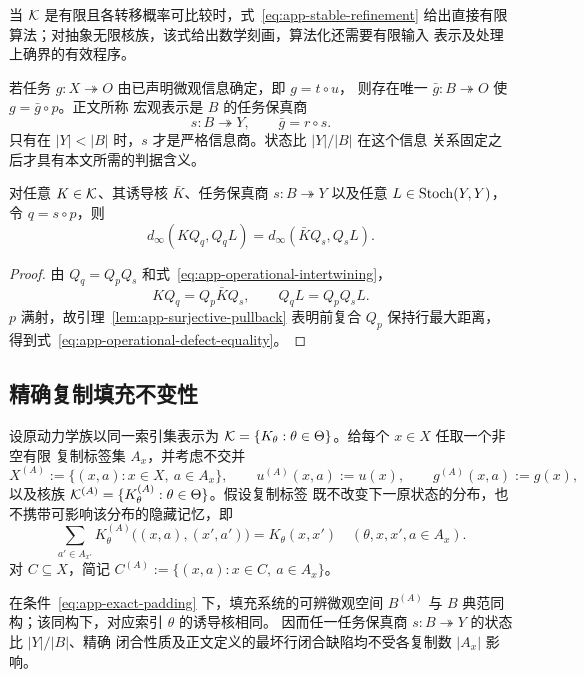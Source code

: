 当 $\mathcal K$ 是有限且各转移概率可比较时，式~\eqref{eq:app-stable-refinement}
给出直接有限算法；对抽象无限核族，该式给出数学刻画，算法化还需要有限输入
表示及处理上确界的有效程序。

若任务 $g:X\twoheadrightarrow O$ 由已声明微观信息确定，即 $g=t\circ u$，
则存在唯一 $\bar g:B\twoheadrightarrow O$ 使 $g=\bar g\circ p$。正文所称
宏观表示是 $B$ 的任务保真商
\[
  s:B\twoheadrightarrow Y,
  \qquad \bar g=r\circ s.
\]
只有在 $|Y|<|B|$ 时，$s$ 才是严格信息商。状态比 $|Y|/|B|$ 在这个信息
关系固定之后才具有本文所需的判据含义。

\begin{proposition}[约化前后闭合缺陷相同]
\label{prop:app-operational-defect-equality}
对任意 $K\in\mathcal K$、其诱导核 $\bar K$、任务保真商
$s:B\twoheadrightarrow Y$ 以及任意 $L\in\operatorname{Stoch}(Y,Y)$，令
$q=s\circ p$，则
\begin{equation}
 d_\infty(KQ_q,Q_qL)
 =
 d_\infty(\bar KQ_s,Q_sL).
 \label{eq:app-operational-defect-equality}
\end{equation}
\end{proposition}

\begin{proof}
由 $Q_q=Q_pQ_s$ 和式~\eqref{eq:app-operational-intertwining}，
\[
 KQ_q=Q_p\bar KQ_s,
 \qquad
 Q_qL=Q_pQ_sL.
\]
$p$ 满射，故引理~\ref{lem:app-surjective-pullback} 表明前复合 $Q_p$
保持行最大距离，得到式~\eqref{eq:app-operational-defect-equality}。
\end{proof}

\subsection{精确复制填充不变性}

设原动力学族以同一索引集表示为
$\mathcal K=\{K_\theta:\theta\in\Theta\}$。给每个 $x\in X$ 任取一个非空有限
复制标签集 $A_x$，并考虑不交并
\[
 X^{(A)}:=\{(x,a):x\in X,\ a\in A_x\},
 \qquad
 u^{(A)}(x,a):=u(x),
 \qquad
 g^{(A)}(x,a):=g(x),
\]
以及核族 $\mathcal K^{(A)}=\{K_\theta^{(A)}:\theta\in\Theta\}$。假设复制标签
既不改变下一原状态的分布，也不携带可影响该分布的隐藏记忆，即
\begin{equation}
 \sum_{a'\in A_{x'}}
 K_\theta^{(A)}\bigl((x,a),(x',a')\bigr)
 =K_\theta(x,x')
 \quad
 (\theta,x,x',a\in A_x).
 \label{eq:app-exact-padding}
\end{equation}
对 $C\subseteq X$，简记
$C^{(A)}:=\{(x,a):x\in C,\ a\in A_x\}$。

\begin{theorem}[无意义复制填充不变性]
\label{thm:app-padding-invariance}
在条件~\eqref{eq:app-exact-padding} 下，填充系统的可辨微观空间
$B^{(A)}$ 与 $B$ 典范同构；该同构下，对应索引 $\theta$ 的诱导核相同。
因而任一任务保真商 $s:B\twoheadrightarrow Y$ 的状态比 $|Y|/|B|$、精确
闭合性质及正文定义的最坏行闭合缺陷均不受各复制数 $|A_x|$ 影响。
\end{theorem}

